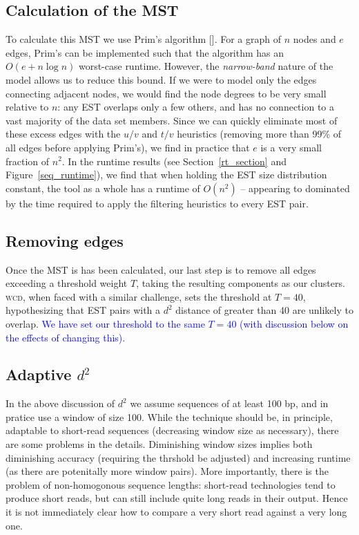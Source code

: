 \documentclass[a4paper,12pt]{article}
\newcommand{\mc}[1]{\textcolor{blue}{#1}}
\begin{document}
\begin{appendix}
\subsection{Calculation of the MST}

To calculate this MST we use Prim's algorithm [\cite{Prim57}].  For a
graph of $n$ nodes and $e$ edges, Prim's can be implemented such that
the algorithm has an $O(e + n \log n)$ worst-case runtime.  However,
the {\it narrow-band} nature of the model allows us to reduce this
bound.  If we were to model only the edges connecting adjacent nodes,
we would find the node degrees to be very small relative to $n$: any
EST overlaps only a few others, and has no connection to a vast
majority of the data set members.  Since we can quickly eliminate most
of these excess edges with the $u/v$ and $t/v$ heuristics (removing
more than 99\% of all edges before applying Prim's), we find in
practice that $e$ is a very small fraction of $n^2$.  In the
runtime results (see Section~\ref{rt_section} and
Figure~\ref{seq_runtime}), we find that when holding the EST size
distribution constant, the tool as a whole has a runtime of $O(n^2)$
-- appearing to dominated by the time required to apply
the filtering heuristics to every EST pair.

\subsection{Removing edges}

Once the MST is has been calculated, our last step is to remove all
edges exceeding a threshold weight $T$, taking the resulting
components as our clusters.  \textsc{wcd}, when faced with a similar
challenge, sets the threshold at $T=40$, hypothesizing that EST pairs
with a $d^2$ distance of greater than 40 are unlikely to overlap.  \mc{We
have set our threshold to the same $T=40$ (with discussion below on
the effects of changing this).}

\subsection{Adaptive $d^2$}

In the above discussion of $d^2$ we assume sequences of at least 100 bp, and
in pratice use a window of size 100.  While the technique should be,
in principle, adaptable to short-read sequences (decreasing window
size as necessary), there are some problems in the details.
Diminishing window sizes implies both diminishing accuracy (requiring
the thrshold be adjusted) and increasing runtime (as there are
potenitally more window pairs).  More importantly, there is the
problem of non-homogonous sequence lengths: short-read technologies
tend to produce short reads, but can still include quite long reads in
their output.  Hence it is not immediately clear how to compare a very
short read against a very long one.


\end{appendix}
\end{document}
